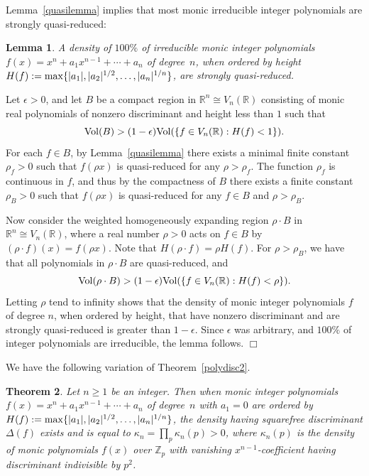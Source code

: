 \documentclass[11pt]{article}
\def\Z{{\mathbb Z}}
\def\Vol{{\rm Vol}}
\def\R{{\mathbb R}}
\def\Vmn{{V_n}}
\def\Z{{\mathbb Z}}
\def\max{{\rm max}}
\newtheorem{theorem}{Theorem}[section]
\newtheorem{lemma}[theorem]{Lemma}
\newenvironment{proof}{\noindent {\bf Proof:}}{$\Box$ \vspace{2 ex}}
\begin{document}
 \noindent
 Lemma~\ref{quasilemma} implies that most monic irreducible integer
 polynomials are strongly quasi-reduced:

\begin{lemma}\label{mostqr}
A density of $100\%$ of irreducible monic integer polynomials
$f(x)=x^n+a_1x^{n-1}+\cdots+a_n$ of degree~$n$, when ordered by
height $H(f):=\max\{|a_1|,|a_2|^{1/2},\ldots,|a_n|^{1/n}\}$,
are strongly quasi-reduced.
\end{lemma}

\begin{proof}
Let $\epsilon>0$, and let $B$ be a compact region in $\R^n\cong
\Vmn(\R)$ consisting of monic real polynomials of nonzero discriminant
and height less than $1$ such that $$\Vol(B)>(1-\epsilon)\Vol(\{f\in
\Vmn(\R):H(f)<1\}).$$ For each $f\in B$, by Lemma~\ref{quasilemma}
there exists a minimal finite constant $\rho_f>0$ such that $f(\rho
x)$ is quasi-reduced for any $\rho>\rho_f$. The function $\rho_f$ is
continuous in $f$, and thus by the compactness of $B$ there exists a
finite constant $\rho_B>0$ such that $f(\rho x)$ is quasi-reduced for
any $f\in B$ and $\rho>\rho_B$.

Now consider the weighted homogeneously expanding region $\rho\cdot B$
in $\R^n\cong \Vmn(\R)$, where a real number $\rho>0$ acts on $f\in B$
by $(\rho\cdot f)(x)=f(\rho x)$.  Note that $H(\rho\cdot f)=\rho
H(f)$.  For $\rho>\rho_B$, we have that all polynomials in $\rho\cdot
B$ are quasi-reduced, and
$$\Vol(\rho\cdot B)>(1-\epsilon)\Vol(\{f\in \Vmn(\R):H(f)<\rho\}).$$
Letting $\rho$ tend to infinity shows that the density of monic
integer polynomials $f$ of degree $n$, when ordered by height, that
have nonzero discriminant and are strongly quasi-reduced is greater
than $1-\epsilon$. Since $\epsilon$ was arbitrary, and $100\%$ of integer
polynomials are irreducible, the lemma follows.
\end{proof}

We have the following variation of Theorem~\ref{polydisc2}.

\begin{theorem}\label{vanishinga1}
Let $n\geq1$ be an integer.  Then when
monic integer polynomials $f(x)=x^n+a_1x^{n-1}+\cdots+a_n$ of
degree~$n$ with $a_1=0$ are ordered by $H(f):=
\max\{|a_1|,|a_2|^{1/2},\ldots,|a_n|^{1/n}\}$, the density having
squarefree discriminant $\Delta(f)$ exists and is equal to
$\kappa_n=\prod_p\kappa_n(p)>0$, where $\kappa_n(p)$ is the density of
monic polynomials $f(x)$ over $\Z_p$ with vanishing
$x^{n-1}$-coefficient having discriminant indivisible by $p^2$.
\end{theorem}
\end{document}
